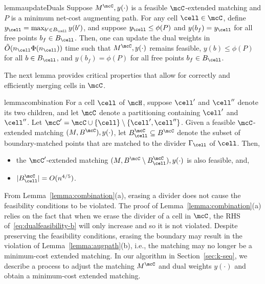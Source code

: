 \begin{restatable}{lemma}{updateDuals}\label{lemma:fresh_duals}
        Suppose $M^\mcC, y(\cdot)$ is a feasible $\mcC$-extended matching and $P$ is a minimum net-cost augmenting path. For any cell $\cell\in\mcC$, define $y_\cell=\max_{b' \in B_{\cell}} y(b')$, and suppose $y_\cell\le \phi(P)$ and $y(b_f)=y_\cell$ for all free points $b_f\in B_\cell$. Then, one can update the dual weights in $\tilde{O}(n_\cell\Phi(n_\cell))$ time such that $M^\mcC, y(\cdot)$ remains feasible, $y(b)\le \phi(P)$ for all $b\in B_\cell$, and $y(b_f)=\phi(P)$ for all free points $b_f\in B_\cell$.
\end{restatable}

\vspace{0.5em}
The next lemma provides critical properties that allow for correctly and efficiently merging cells in $\mcC$. 


\begin{restatable}{lemma}{combination}\label{lemma:combination}
    For a cell $\cell$ of $\mcH$, suppose $\cell'$ and $\cell''$ denote its two children, and let $\mcC$ denote a partitioning containing $\cell'$ and $\cell''$. Let $\mcC'=\mcC\cup\{\cell\}\setminus\{\cell',\cell''\}$. Given a feasible $\mcC$-extended matching $(M, B^\mcC), y(\cdot)$, let $B_\cell^\mcC\subseteq B^\mcC$ denote the subset of boundary-matched points that are matched to the divider $\Gamma_\cell$ of $\cell$. Then,
    \begin{itemize}
        \item[(a)] the $\mcC'$-extended matching $(M, B^\mcC\setminus B_\cell^\mcC), y(\cdot)$ is also feasible, and,
        \item[(b)]  $|B_\cell^\mcC|=O(n^{4/5})$.
    \end{itemize}
\end{restatable}

\vspace{1em}

From Lemma~\ref{lemma:combination}(a), erasing a divider  does not cause the feasibility conditions to be violated. The proof of Lemma~\ref{lemma:combination}(a) relies on the fact that when we erase the divider of a cell in $\mcC$, the RHS of~\eqref{eq:dualfeasibility-b} will only increase and so it is not violated. Despite preserving the feasibility conditions, erasing the boundary may result in the violation of Lemma~\ref{lemma:augpath}(b), i.e., the matching may no longer be a minimum-cost extended matching. 
%
In our algorithm in Section~\ref{sec:k-seq}, we describe a process to adjust the matching $M^\mcC$ and dual weights $y(\cdot)$ and obtain a minimum-cost extended matching. 


